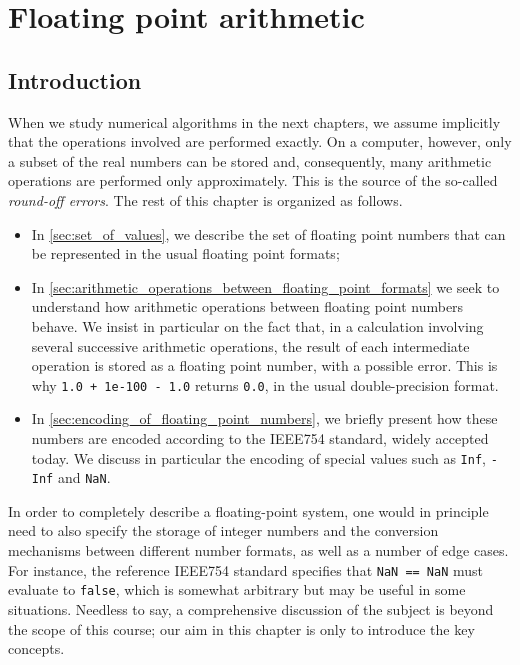\chapter{Floating point arithmetic}%
\label{cha:rounding_errors}
\minitoc

\section{Introduction}%
\label{sec:introduction}
When we study numerical algorithms in the next chapters,
we assume implicitly that the operations involved are performed exactly.
On a computer, however, only a subset of the real numbers can be stored and,
consequently, many arithmetic operations are performed only approximately.
This is the source of the so-called \emph{round-off errors}.
The rest of this chapter is organized as follows.
\begin{itemize}
    \item
        In \cref{sec:set_of_values},
        we describe the set of floating point numbers that can be represented in the usual floating point formats;
    \item
        In \cref{sec:arithmetic_operations_between_floating_point_formats}
        we seek to understand how arithmetic operations between floating point numbers behave.
        We insist in particular on the fact that,
        in a calculation involving several successive arithmetic operations,
        the result of each intermediate operation is stored as a floating point number,
        with a possible error.
        This is why \texttt{1.0 + 1e-100 - 1.0} returns \texttt{0.0},
        in the usual double-precision format.
    \item
        In \cref{sec:encoding_of_floating_point_numbers},
        we briefly present how these numbers are encoded
        according to the IEEE754 standard, widely accepted today.
        We discuss in particular the encoding of special values such as \texttt{Inf}, \texttt{-Inf} and \texttt{NaN}.
\end{itemize}
In order to completely describe a floating-point system,
one would in principle need to also specify the storage of integer numbers
and the conversion mechanisms between different number formats,
as well as a number of edge cases.
For instance, the reference IEEE754 standard specifies that \texttt{NaN == NaN} must evaluate to \texttt{false},
which is somewhat arbitrary but may be useful in some situations.
Needless to say,
a comprehensive discussion of the subject is beyond the scope of this course;
our aim in this chapter is only to introduce the key concepts.

